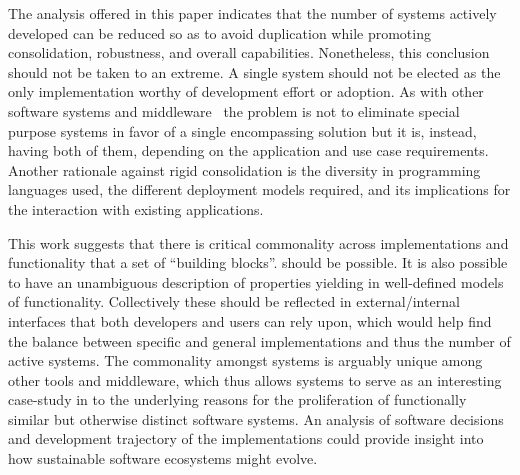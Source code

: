 \documentclass{sig-alternate}
\begin{document}


The analysis offered in this paper indicates that the number of \pilot systems
actively developed can be reduced so as to avoid duplication while promoting
consolidation, robustness, and overall capabilities.  Nonetheless, this
conclusion should not be taken to an extreme. A single \pilot system should not
be elected as the only implementation worthy of development effort or adoption.
As with other software systems and middleware~\cite{bernstein1996} the problem
is not to eliminate special purpose systems in favor of a single encompassing
solution but it is, instead, having both of them, depending on the application
and use case requirements.  Another rationale against rigid consolidation is the
diversity in programming languages used, the different deployment models
required, and its implications for the interaction with existing applications.


This work suggests that there is critical commonality across \pilot
implementations and functionality that a set of \pilot ``building blocks''.
should be possible.  It is also possible to have an unambiguous description of
properties yielding in well-defined models of \pilot functionality. Collectively
these should be reflected in external/internal interfaces that both developers
and users can rely upon, which would help
find the balance between specific and general implementations and thus the
number of active \pilot systems. The commonality amongst \pilot systems is
arguably unique among other tools and middleware, which thus allows \pilot
systems to serve as an interesting case-study in to the underlying reasons for
the proliferation of functionally similar but otherwise distinct software
systems.  An analysis of software decisions and development trajectory of the
\pilot implementations could provide insight into how sustainable software
ecosystems might evolve.
\end{document}
